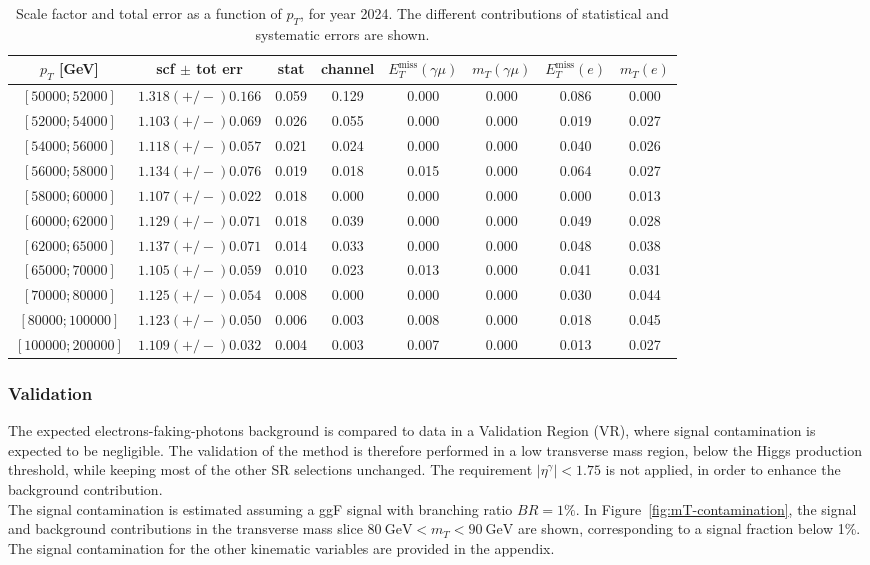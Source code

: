 \begin{table}[h]
  \centering
  \begin{tabular}{|c|c|c|c|c|c|c|c|}
    \hline
    $p_T$ [GeV] & scf $\pm$ tot err & stat & channel & $E_T^{\text{miss}}(\gamma\mu)$ & $m_T(\gamma\mu)$ &  $E_T^{\text{miss}}(e)$ & $m_T(e)$ \\
    \hline
    $[50000;52000]$ & $1.318(+/-)0.166$ & 0.059 &  0.129 & 0.000 & 0.000 & 0.086 &  0.000 \\
    $[52000;54000]$ & $1.103(+/-)0.069$ & 0.026 &  0.055 & 0.000 & 0.000 & 0.019 &  0.027 \\
    $[54000;56000]$ & $1.118(+/-)0.057$ & 0.021 &  0.024 & 0.000 & 0.000 & 0.040 &  0.026 \\
    $[56000;58000]$ & $1.134(+/-)0.076$ & 0.019 &  0.018 & 0.015 & 0.000 & 0.064 &  0.027 \\
    $[58000;60000]$ & $1.107(+/-)0.022$ & 0.018 &  0.000 & 0.000 & 0.000 & 0.000 &  0.013 \\
    $[60000;62000]$ & $1.129(+/-)0.071$ & 0.018 &  0.039 & 0.000 & 0.000 & 0.049 &  0.028 \\
    $[62000;65000]$ & $1.137(+/-)0.071$ & 0.014 &  0.033 & 0.000 & 0.000 & 0.048 &  0.038 \\
    $[65000;70000]$ & $1.105(+/-)0.059$ & 0.010 &  0.023 & 0.013 & 0.000 & 0.041 &  0.031 \\
    $[70000;80000]$ & $1.125(+/-)0.054$ & 0.008 &  0.000 & 0.000 & 0.000 & 0.030 &  0.044 \\
    $[80000;100000]$ & $1.123(+/-)0.050$ & 0.006 &  0.003 & 0.008 & 0.000 & 0.018 &  0.045 \\
    $[100000;200000]$ & $1.109(+/-)0.032$ & 0.004 &  0.003 & 0.007 & 0.000 & 0.013 &  0.027 \\
    \hline
  \end{tabular}
  \caption{Scale factor and total error as a function of $p_T$, for year 2024. The different contributions of statistical and systematic errors are shown.}
  \label{tab:scf-results-2024}
\end{table}


\subsubsection{Validation}
The expected electrons-faking-photons background is compared to data in a Validation Region (VR), where signal contamination is expected to be negligible.
The validation of the method is therefore performed in a low transverse mass region, below the Higgs production threshold, while keeping most of the other SR selections unchanged. 
The requirement $|\eta^\gamma| < 1.75$ is not applied, in order to enhance the background contribution. \\
The signal contamination is estimated assuming a ggF signal with branching ratio $BR = 1\%$.
In Figure~\ref{fig:mT-contamination}, the signal and background contributions in the transverse mass slice $80~\mathrm{GeV} < m_T < 90~\mathrm{GeV}$ are shown, corresponding to a signal fraction below 1\%. 
The signal contamination for the other kinematic variables are provided in the appendix. \\

